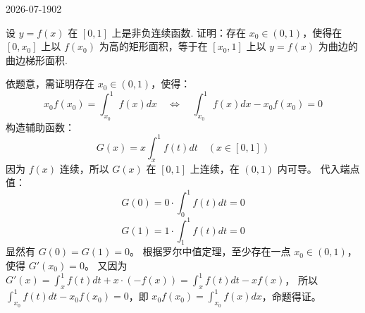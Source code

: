 \begin{mistake}{2026-07-19}{02}

\begin{problemcontent}
设 \(y = f(x)\) 在 \([0, 1]\) 上是非负连续函数. 证明：存在 \(x_0 \in (0, 1)\)，使得在 \([0, x_0]\) 上以 \(f(x_0)\) 为高的矩形面积，等于在 \([x_0, 1]\) 上以 \(y = f(x)\) 为曲边的曲边梯形面积.
\end{problemcontent}

\begin{solutioncontent}
依题意，需证明存在 \(x_0 \in (0, 1)\)，使得：
\[ x_0 f(x_0) = \int_{x_0}^1 f(x) dx \quad \iff \quad \int_{x_0}^1 f(x) dx - x_0 f(x_0) = 0 \]
构造辅助函数：
\[ G(x) = x \int_x^1 f(t) dt \quad (x \in [0, 1]) \]
因为 \(f(x)\) 连续，所以 \(G(x)\) 在 \([0, 1]\) 上连续，在 \((0, 1)\) 内可导。
代入端点值：
\[ G(0) = 0 \cdot \int_0^1 f(t) dt = 0 \]
\[ G(1) = 1 \cdot \int_1^1 f(t) dt = 0 \]
显然有 \(G(0) = G(1) = 0\)。
根据罗尔中值定理，至少存在一点 \(x_0 \in (0, 1)\)，使得 \(G'(x_0) = 0\)。
又因为 \(G'(x) = \int_x^1 f(t) dt + x \cdot (-f(x)) = \int_x^1 f(t) dt - x f(x)\)，
所以 \(\int_{x_0}^1 f(t) dt - x_0 f(x_0) = 0\)，即 \(x_0 f(x_0) = \int_{x_0}^1 f(x) dx\)，命题得证。
\end{solutioncontent}


\end{mistake}
